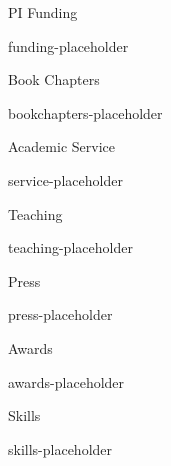 \begin{cvSection}{PI Funding}

{{funding-placeholder}}

\end{cvSection}


\begin{cvSection}{Book Chapters}

{{bookchapters-placeholder}}

\end{cvSection}


\begin{cvSection}{Academic Service}

{{service-placeholder}}

\end{cvSection}

\begin{cvSection}{Teaching}

{{teaching-placeholder}}

\end{cvSection}


\begin{cvSection}{Press}

{{press-placeholder}}

\end{cvSection}


\begin{cvSection}{Awards}

{{awards-placeholder}}

\end{cvSection}


\begin{cvSection}{Skills}

{{skills-placeholder}}

\end{cvSection}



